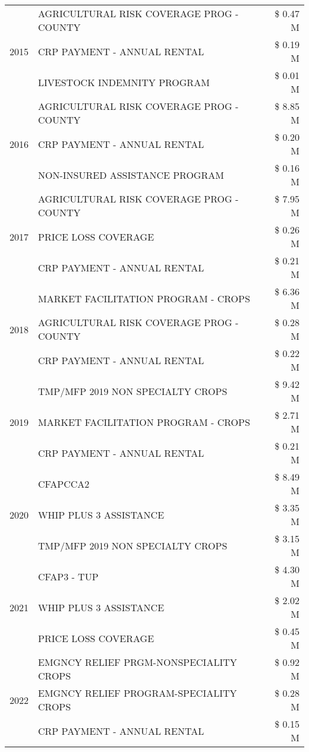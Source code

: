 \begin{tabular}{llr}
\cline{1-3}
\multirow[t]{3}{*}{2015} & AGRICULTURAL RISK COVERAGE PROG - COUNTY & \$ 0.47 M \\
 & CRP PAYMENT - ANNUAL RENTAL & \$ 0.19 M \\
 & LIVESTOCK INDEMNITY PROGRAM & \$ 0.01 M \\
\cline{1-3}
\multirow[t]{3}{*}{2016} & AGRICULTURAL RISK COVERAGE PROG - COUNTY & \$ 8.85 M \\
 & CRP PAYMENT - ANNUAL RENTAL & \$ 0.20 M \\
 & NON-INSURED ASSISTANCE PROGRAM & \$ 0.16 M \\
\cline{1-3}
\multirow[t]{3}{*}{2017} & AGRICULTURAL RISK COVERAGE PROG - COUNTY & \$ 7.95 M \\
 & PRICE LOSS COVERAGE & \$ 0.26 M \\
 & CRP PAYMENT - ANNUAL RENTAL & \$ 0.21 M \\
\cline{1-3}
\multirow[t]{3}{*}{2018} & MARKET FACILITATION PROGRAM - CROPS & \$ 6.36 M \\
 & AGRICULTURAL RISK COVERAGE PROG - COUNTY & \$ 0.28 M \\
 & CRP PAYMENT - ANNUAL RENTAL & \$ 0.22 M \\
\cline{1-3}
\multirow[t]{3}{*}{2019} & TMP/MFP 2019 NON SPECIALTY CROPS & \$ 9.42 M \\
 & MARKET FACILITATION PROGRAM - CROPS & \$ 2.71 M \\
 & CRP PAYMENT - ANNUAL RENTAL & \$ 0.21 M \\
\cline{1-3}
\multirow[t]{3}{*}{2020} & CFAPCCA2 & \$ 8.49 M \\
 & WHIP PLUS 3 ASSISTANCE & \$ 3.35 M \\
 & TMP/MFP 2019 NON SPECIALTY CROPS & \$ 3.15 M \\
\cline{1-3}
\multirow[t]{3}{*}{2021} & CFAP3 - TUP & \$ 4.30 M \\
 & WHIP PLUS 3 ASSISTANCE & \$ 2.02 M \\
 & PRICE LOSS COVERAGE & \$ 0.45 M \\
\cline{1-3}
\multirow[t]{3}{*}{2022} & EMGNCY RELIEF PRGM-NONSPECIALITY CROPS & \$ 0.92 M \\
 & EMGNCY RELIEF PROGRAM-SPECIALITY CROPS & \$ 0.28 M \\
 & CRP PAYMENT - ANNUAL RENTAL & \$ 0.15 M \\
\cline{1-3}
\bottomrule
\end{tabular}
